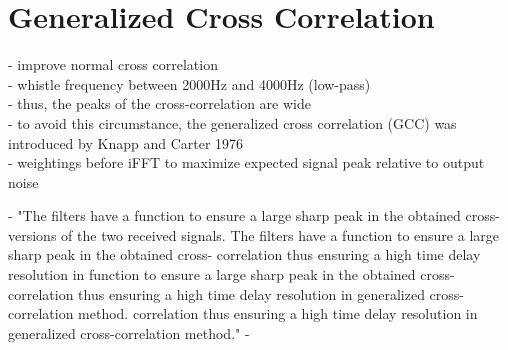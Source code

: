 \section{Generalized Cross Correlation}

- improve normal cross correlation\\
- whistle frequency between 2000Hz and 4000Hz (low-pass)\\
- thus, the peaks of the cross-correlation are wide\\
- to avoid this circumstance, the generalized cross correlation (GCC)
was introduced by Knapp and Carter 1976 \cite{K_C_GCC} \\
- weightings before iFFT to maximize expected signal peak relative
to output noise \cite{H_B_GCC}


- 
"The filters have a function to ensure a large sharp peak in the obtained cross-versions of the two received signals. The filters have a function to ensure a large sharp peak in the obtained cross- correlation thus ensuring a high time delay resolution in
function to ensure a large sharp peak in the obtained cross- correlation thus ensuring a high time delay resolution in generalized cross-correlation method.
correlation thus ensuring a high time delay resolution in generalized cross-correlation method." - 